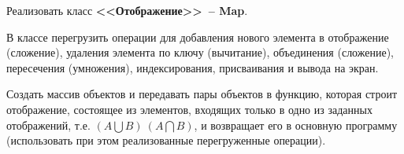 Реализовать класс \textbf{<<Отображение>>~-- Map}.

В классе перегрузить операции для добавления нового элемента в
отображение (сложение), удаления элемента по ключу (вычитание), объединения
(сложение), пересечения (умножения), индексирования, присваивания и вывода на экран.

Создать массив объектов и передавать пары объектов в функцию, которая строит
отображение, состоящее из элементов, входящих только в одно из заданных отображений,
т.е. $(A\bigcup B) \ (A\bigcap B)$, и возвращает его в основную программу (использовать при этом
реализованные перегруженные операции).
